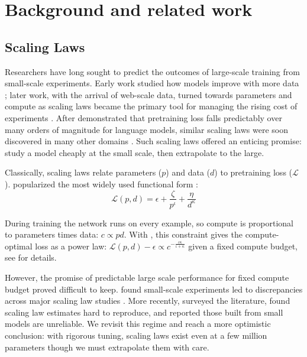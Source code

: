 \section{Background and related work}
\label{sec:background}

\subsection{Scaling Laws}
\label{sec:background:scaling-laws}

Researchers have long sought to predict the outcomes of large-scale training from small-scale experiments. Early work studied how models improve with more data \citep{cortes1993learning, hestness2017deep, sun2017revisiting}; later work, with the arrival of web-scale data, turned towards parameters and compute as scaling laws became the primary tool for managing the rising cost of experiments \citep{rosenfeld2020a, Kaplan2020ScalingLaws}. After \citet{Kaplan2020ScalingLaws} demonstrated that pretraining loss falls predictably over many orders of magnitude for language models, similar scaling laws were soon discovered in many other domains \citep{henighan2020scalinglawsautoregressivegenerative, jones2021scalingscalinglawsboard, Cherti_2023_CVPR}. Such scaling laws offered an enticing promise: study a model cheaply at the small scale, then extrapolate to the large.
 
Classically, scaling laws  relate parameters ($p$) and data ($d$) to pretraining loss ($\mathcal{L}$). \citet{Hoffmann2022AnEmpirical} popularized the most widely used functional form \citep{rosenfeld2020a}:
%
\begin{equation}\label{eq:scaling-law_joint}
    \mathcal{L}(p, d) = \epsilon + \frac{\zeta}{p^\iota} + \frac{\eta}{d^\kappa}
\end{equation}
%

During training the network runs on every example, so compute is proportional to parameters times data: $c \propto p d$. With  , this constraint gives the compute-optimal loss as a power law: $\mathcal{L}(p, d) - \epsilon \propto c^{-\frac{\iota\kappa}{\iota + \kappa}}$ given a fixed compute budget, see  for details. 

However, the promise of predictable large scale performance for fixed compute budget proved difficult to keep. \citet{pearce2024reconciling} found small-scale experiments led to discrepancies across major scaling law studies \citep{Kaplan2020ScalingLaws, Hoffmann2022AnEmpirical}. More recently, \citet{li2025misfitting} surveyed the literature, found scaling law estimates hard to reproduce, and reported those built from small models are unreliable. We revisit this regime and reach a more optimistic conclusion: with rigorous tuning, scaling laws exist even at a few million parameters though we must extrapolate them with care.


